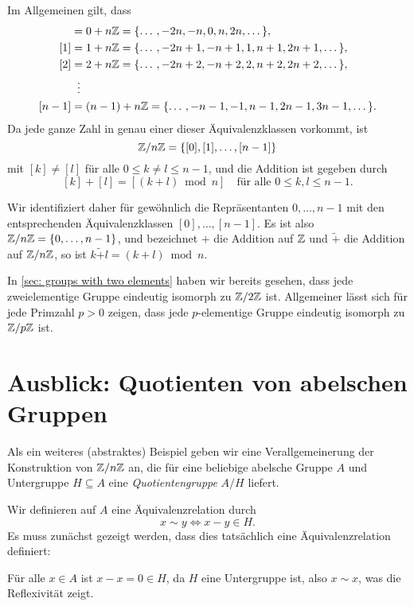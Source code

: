 Im Allgemeinen gilt, dass
\begin{align*}
 [0] &= 0+n\Zbb = \{\dotso, -2n, -n, 0, n, 2n, \dotso\}, \\
 [1] &= 1+n\Zbb = \{\dotso, -2n+1, -n+1, 1, n+1, 2n+1, \dotso\}, \\
 [2] &= 2+n\Zbb = \{\dotso, -2n+2, -n+2, 2, n+2, 2n+2, \dotso\}, \\
     &\;\;\vdots \\
 [n-1] &= (n-1)+n\Zbb = \{\dotso, -n-1, -1, n-1, 2n-1, 3n-1, \dotso\}.
\end{align*}
Da jede ganze Zahl in genau einer dieser Äquivalenzklassen vorkommt, ist
\[
 \mathbb{Z}/n\mathbb{Z} = \{[0], [1], \dotsc, [n-1]\}
\]
mit $[k] \neq [l]$ für alle $0 \leq k \neq l \leq n-1$, und die Addition ist gegeben durch
\[
 [k] + [l] = [(k+l) \bmod n]
 \quad
 \text{für alle $0 \leq k,l \leq n-1$}.
\]

Wir identifiziert daher für gewöhnlich die Repräsentanten $0, \dotsc, n-1$ mit den entsprechenden Äquivalenzklassen $[0], \dotsc, [n-1]$. Es ist also $\mathbb{Z}/n\mathbb{Z} = \{0, \dotsc, n-1\}$, und bezeichnet $+$ die Addition auf $\mathbb{Z}$ und $\tilde{+}$ die Addition auf $\mathbb{Z}/n\mathbb{Z}$, so ist $k \mathbin{\tilde{+}} l = (k+l) \bmod n$.


\begin{bem}
 In \ref{sec: groups with two elements} haben wir bereits gesehen, dass jede zweielementige Gruppe eindeutig isomorph zu $\mathbb{Z}/2\mathbb{Z}$ ist. Allgemeiner lässt sich für jede Primzahl $p > 0$ zeigen, dass jede $p$-elementige Gruppe eindeutig isomorph zu $\mathbb{Z}/p\mathbb{Z}$ ist.
\end{bem}





\section{Ausblick: Quotienten von abelschen Gruppen}
Als ein weiteres (abstraktes) Beispiel geben wir eine Verallgemeinerung der Konstruktion von $\mathbb{Z}/n\mathbb{Z}$ an, die für eine beliebige abelsche Gruppe $A$ und Untergruppe $H \subseteq A$ eine \emph{Quotientengruppe} $A/H$ liefert.

Wir definieren auf $A$ eine Äquivalenzrelation durch
\[
 x \sim y \iff x-y \in H.
\]
Es muss zunächst gezeigt werden, dass dies tatsächlich eine Äquivalenzrelation definiert:

Für alle $x \in A$ ist $x-x = 0 \in H$, da $H$ eine Untergruppe ist, also $x \sim x$, was die Reflexivität zeigt.

